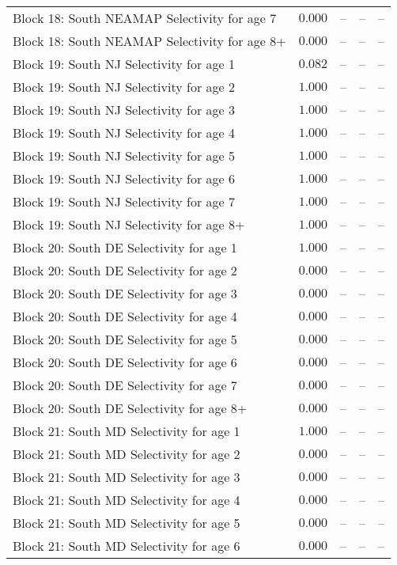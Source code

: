 \documentclass[
]{article}
\begin{document}
\begin{landscape}
\begin{longtable}[t]{lrrrr}
Block 18: South NEAMAP Selectivity for age 7 & $0.000$ & -- & -- & --\\
\addlinespace
Block 18: South NEAMAP Selectivity for age 8+ & $0.000$ & -- & -- & --\\
Block 19: South NJ Selectivity for age 1 & $0.082$ & -- & -- & --\\
Block 19: South NJ Selectivity for age 2 & $1.000$ & -- & -- & --\\
Block 19: South NJ Selectivity for age 3 & $1.000$ & -- & -- & --\\
Block 19: South NJ Selectivity for age 4 & $1.000$ & -- & -- & --\\
\addlinespace
Block 19: South NJ Selectivity for age 5 & $1.000$ & -- & -- & --\\
Block 19: South NJ Selectivity for age 6 & $1.000$ & -- & -- & --\\
Block 19: South NJ Selectivity for age 7 & $1.000$ & -- & -- & --\\
Block 19: South NJ Selectivity for age 8+ & $1.000$ & -- & -- & --\\
Block 20: South DE Selectivity for age 1 & $1.000$ & -- & -- & --\\
\addlinespace
Block 20: South DE Selectivity for age 2 & $0.000$ & -- & -- & --\\
Block 20: South DE Selectivity for age 3 & $0.000$ & -- & -- & --\\
Block 20: South DE Selectivity for age 4 & $0.000$ & -- & -- & --\\
Block 20: South DE Selectivity for age 5 & $0.000$ & -- & -- & --\\
Block 20: South DE Selectivity for age 6 & $0.000$ & -- & -- & --\\
\addlinespace
Block 20: South DE Selectivity for age 7 & $0.000$ & -- & -- & --\\
Block 20: South DE Selectivity for age 8+ & $0.000$ & -- & -- & --\\
Block 21: South MD Selectivity for age 1 & $1.000$ & -- & -- & --\\
Block 21: South MD Selectivity for age 2 & $0.000$ & -- & -- & --\\
Block 21: South MD Selectivity for age 3 & $0.000$ & -- & -- & --\\
\addlinespace
Block 21: South MD Selectivity for age 4 & $0.000$ & -- & -- & --\\
Block 21: South MD Selectivity for age 5 & $0.000$ & -- & -- & --\\
Block 21: South MD Selectivity for age 6 & $0.000$ & -- & -- & --\\

\end{longtable}
\end{landscape}
\end{document}
